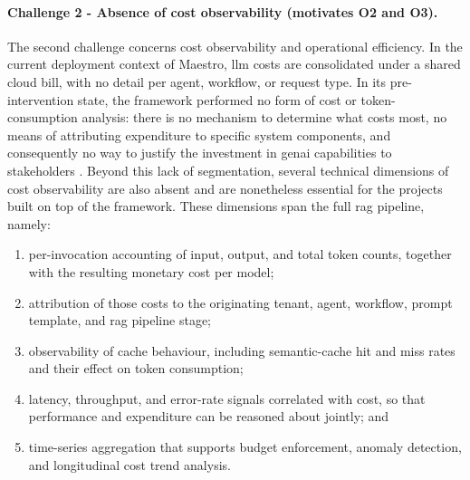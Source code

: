 \paragraph{Challenge 2 - Absence of cost observability (motivates O2 and O3).}
The second challenge concerns cost observability and operational efficiency. In the current deployment context of Maestro, \gls{llm} costs are consolidated under a shared cloud bill, with no detail per agent, workflow, or request type. In its pre-intervention state, the framework performed no form of cost or token-consumption analysis: there is no mechanism to determine what costs most, no means of attributing expenditure to specific system components, and consequently no way to justify the investment in \gls{genai} capabilities to stakeholders \cite{wu2022sustainable}. Beyond this lack of segmentation, several technical dimensions of cost observability are also absent and are nonetheless essential for the projects built on top of the framework. These dimensions span the full \acrfull{rag} pipeline, namely:
%
\begin{enumerate}
    \item per-invocation accounting of input, output, and total token counts, together with the resulting monetary cost per model;
    \item attribution of those costs to the originating tenant, agent, workflow, prompt template, and \gls{rag} pipeline stage;
    \item observability of cache behaviour, including semantic-cache hit and miss rates and their effect on token consumption;
    \item latency, throughput, and error-rate signals correlated with cost, so that performance and expenditure can be reasoned about jointly; and
    \item time-series aggregation that supports budget enforcement, anomaly detection, and longitudinal cost trend analysis.
\end{enumerate}
%
